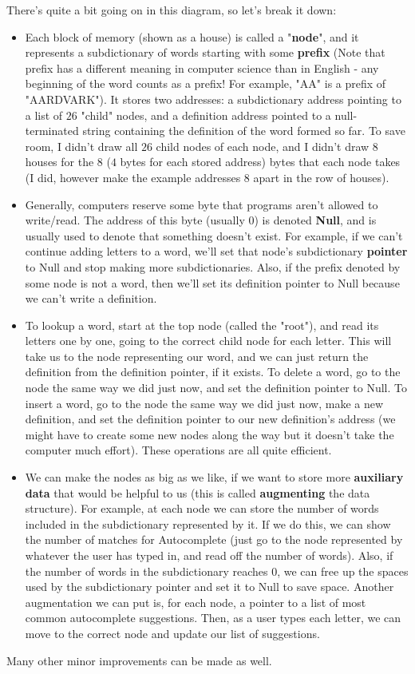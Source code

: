 \documentclass[12pt]{article}
\begin{document}
There's quite a bit going on in this diagram, so let's break it down:
\begin{itemize}
  \item Each block of memory (shown as a house) is called a "\textbf{node}", and it represents a subdictionary of words starting with some \textbf{prefix} (Note that prefix has a different meaning in computer science than in English - any beginning of the word counts as a prefix! For example, "AA" is a prefix of "AARDVARK"). It stores two addresses: a subdictionary address pointing to a list of $26$ "child" nodes, and a definition address pointed to a null-terminated string containing the definition of the word formed so far. To save room, I didn't draw all $26$ child nodes of each node, and I didn't draw $8$ houses for the $8$ ($4$ bytes for each stored address) bytes that each node takes (I did, however make the example addresses $8$ apart in the row of houses).
  \item Generally, computers reserve some byte that programs aren't allowed to write/read. The address of this byte (usually $0$) is denoted \textbf{Null}, and is usually used to denote that something doesn't exist. For example, if we can't continue adding letters to a word, we'll set that node's subdictionary \textbf{pointer} to Null and stop making more subdictionaries. Also, if the prefix denoted by some node is not a word, then we'll set its definition pointer to Null because we can't write a definition.
  \item To lookup a word, start at the top node (called the "root"), and read its letters one by one, going to the correct child node for each letter. This will take us to the node representing our word, and we can just return the definition from the definition pointer, if it exists. To delete a word, go to the node the same way we did just now, and set the definition pointer to Null. To insert a word, go to the node the same way we did just now, make a new definition, and set the definition pointer to our new definition's address (we might have to create some new nodes along the way but it doesn't take the computer much effort). These operations are all quite efficient.
  \item We can make the nodes as big as we like, if we want to store more \textbf{auxiliary data} that would be helpful to us (this is called \textbf{augmenting} the data structure). For example, at each node we can store the number of words included in the subdictionary represented by it. If we do this, we can show the number of matches for Autocomplete (just go to the node represented by whatever the user has typed in, and read off the number of words). Also, if the number of words in the subdictionary reaches $0$, we can free up the spaces used by the subdictionary pointer and set it to Null to save space. Another augmentation we can put is, for each node, a pointer to a list of most common autocomplete suggestions. Then, as a user types each letter, we can move to the correct node and update our list of suggestions.
\end{itemize}
Many other minor improvements can be made as well.
\end{document}
